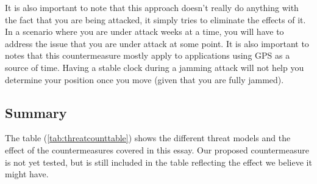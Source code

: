 \documentclass[12pt,english,a4paper]{article}
\begin{document}
It is also important to note that this approach doesn't really do anything with the fact that you are being attacked, it simply tries to eliminate the effects of it. In a scenario where you are under attack weeks at a time, you will have to address the issue that you are under attack at some point. It is also important to notes that this countermeasure mostly apply to applications using GPS as a source of time. Having a stable clock during a jamming attack will not help you determine your position once you move (given that you are fully jammed).

\newpage
\subsection{Summary}
The table (\ref{tab:threatcounttable}) shows the different threat models and the effect of the countermeasures covered in this essay. Our proposed countermeasure is not yet tested, but is still included in the table reflecting the effect we believe it might have.  
\end{document}
